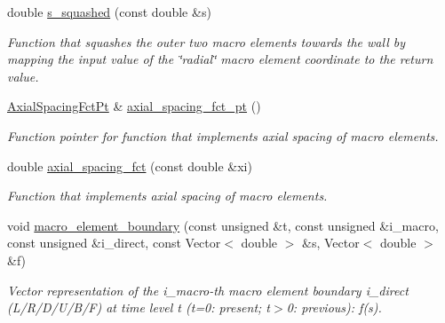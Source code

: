 \begin{DoxyCompactItemize}
double \hyperlink{classoomph_1_1QuarterTubeDomain_a6ecbb8cd59208abef45384d7780853e1}{s\+\_\+squashed} (const double \&s)
\begin{DoxyCompactList}\small\item\em Function that squashes the outer two macro elements towards the wall by mapping the input value of the \char`\"{}radial\char`\"{} macro element coordinate to the return value. \end{DoxyCompactList}\item 
\hyperlink{classoomph_1_1QuarterTubeDomain_ae347af42a5dcb9b3b82c2247975b01db}{Axial\+Spacing\+Fct\+Pt} \& \hyperlink{classoomph_1_1QuarterTubeDomain_a05cf314c7317632829f96a30fee24cde}{axial\+\_\+spacing\+\_\+fct\+\_\+pt} ()
\begin{DoxyCompactList}\small\item\em Function pointer for function that implements axial spacing of macro elements. \end{DoxyCompactList}\item 
double \hyperlink{classoomph_1_1QuarterTubeDomain_a3574feea9f42e4ec95b6edec36da245a}{axial\+\_\+spacing\+\_\+fct} (const double \&xi)
\begin{DoxyCompactList}\small\item\em Function that implements axial spacing of macro elements. \end{DoxyCompactList}\item 
void \hyperlink{classoomph_1_1QuarterTubeDomain_afacee4fe8a6fbc33618643398f5b8ab1}{macro\+\_\+element\+\_\+boundary} (const unsigned \&t, const unsigned \&i\+\_\+macro, const unsigned \&i\+\_\+direct, const Vector$<$ double $>$ \&s, Vector$<$ double $>$ \&f)
\begin{DoxyCompactList}\small\item\em Vector representation of the i\+\_\+macro-\/th macro element boundary i\+\_\+direct (L/\+R/\+D/\+U/\+B/F) at time level t (t=0\+: present; t$>$0\+: previous)\+: f(s). \end{DoxyCompactList}\end{DoxyCompactItemize}

